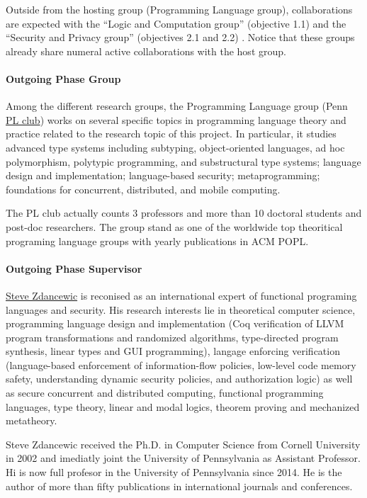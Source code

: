 \documentclass{article}[11pt]
\begin{document}
Outside from the hosting group (Programming Language group), collaborations are expected with the ``Logic and Computation group'' (objective 1.1) and the ``Security and Privacy group'' (objectives 2.1 and 2.2) . Notice that these groups already share numeral active collaborations with the host group.


\paragraph{Outgoing Phase Group}
Among the different research groups, the Programming Language group (Penn \href{http://www.cis.upenn.edu/~plclub/}{PL club})
works on several specific topics in programming language theory and practice related to the
research topic of this project. In particular, it studies advanced type systems including subtyping,
object-oriented languages, ad hoc polymorphism, polytypic programming, and substructural type
systems; language design and implementation; language-based security; metaprogramming;
foundations for concurrent, distributed, and mobile computing. 

The PL club actually counts 3 professors and more than 10 doctoral students and post-doc researchers.  The group stand as one of the worldwide top theoritical programing language groups with yearly publications in ACM POPL.


\paragraph{Outgoing Phase Supervisor}
\href{http://www.cis.upenn.edu/~stevez/}{Steve Zdancewic} is reconised as an international expert of functional programing languages and security. His research interests lie in theoretical computer science, programming language design and implementation (Coq verification of LLVM program transformations and randomized algorithms, type-directed program synthesis, linear types and GUI programming), langage enforcing verification (language-based enforcement of information-flow policies, low-level code memory safety, understanding dynamic security policies, and authorization logic) as well as secure concurrent and distributed computing, functional programming languages, type theory, linear and modal logics, theorem proving and mechanized metatheory. 

Steve Zdancewic received the Ph.D. in Computer Science from Cornell University in 2002 and imediatly joint the University of Pennsylvania as Assistant Professor. Hi is now full profesor in the University of Pennsylvania since 2014. He is the author of more than fifty publications in international journals and conferences.
\end{document}
